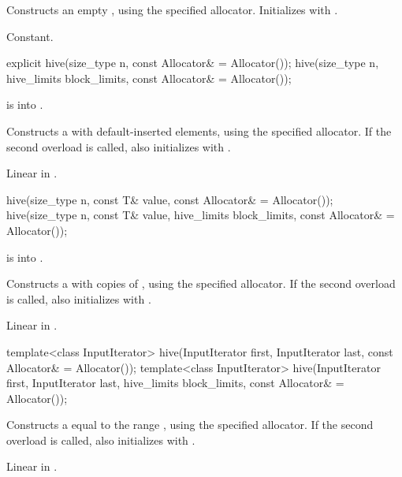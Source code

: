 \begin{itemdescr}
\pnum
\effects
Constructs an empty , using the specified allocator.
Initializes  with .

\pnum
\complexity
Constant.
\end{itemdescr}

%
\begin{itemdecl}
explicit hive(size_type n, const Allocator& = Allocator());
hive(size_type n, hive_limits block_limits, const Allocator& = Allocator());
\end{itemdecl}

\begin{itemdescr}
\pnum
\expects
{} is  into .

\pnum
\effects
Constructs a  with  default-inserted elements,
using the specified allocator.
If the second overload is called,
also initializes  with .

\pnum
\complexity
Linear in .
\end{itemdescr}

%
\begin{itemdecl}
hive(size_type n, const T& value, const Allocator& = Allocator());
hive(size_type n, const T& value, hive_limits block_limits, const Allocator& = Allocator());
\end{itemdecl}

\begin{itemdescr}
\pnum
\expects
{} is  into .

\pnum
\effects
Constructs a  with  copies of ,
using the specified allocator.
If the second overload is called,
also initializes  with .

\pnum
\complexity
Linear in .
\end{itemdescr}

%
\begin{itemdecl}
template<class InputIterator>
  hive(InputIterator first, InputIterator last, const Allocator& = Allocator());
template<class InputIterator>
  hive(InputIterator first, InputIterator last, hive_limits block_limits,
       const Allocator& = Allocator());
\end{itemdecl}

\begin{itemdescr}
\pnum
\effects
Constructs a  equal to the range ,
using the specified allocator.
If the second overload is called,
also initializes  with .

\pnum
\complexity
Linear in .
\end{itemdescr}

